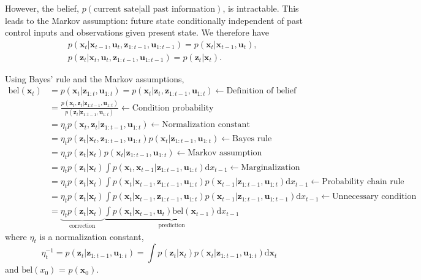 \documentclass[../Bayesian_Inference.tex]{subfiles}
\begin{document}
However, the belief, $p(\text{current sate} | \text{all past information})$, is intractable. This leads to the Markov assumption: future state conditionally independent of past control inputs and observations given present state. We therefore have
\[
    \begin{aligned}
        & p(\bm{x}_t | \bm{x}_{t-1}, \bm{u}_t, \bm{z}_{1:t-1}, \bm{u}_{1:t-1}) = p(\bm{x}_t | \bm{x}_{t-1}, \bm{u}_t), \\
        & p(\bm{z}_t | \bm{x}_{t}, \bm{u}_t, \bm{z}_{1:t-1}, \bm{u}_{1:t-1}) = p(\bm{z}_t | \bm{x}_{t}).
    \end{aligned}
\]

Using Bayes' rule and the Markov assumptions,
\[
    \begin{aligned}
        \mathrm{bel}(\bm{x}_t) & = p(\bm{x}_t | \bm{z}_{1:t}, \bm{u}_{1:t}) = p(\bm{x}_t | \bm{z}_t, \bm{z}_{1:t-1}, \bm{u}_{1:t}) \leftarrow \text{Definition of belief} \\
        & = \frac{p(\bm{x}_t, \bm{z}_t |\bm{z}_{1:t-1}, \bm{u}_{1:t})}{p(\bm{z}_t | \bm{z}_{1:t-1},\bm{u}_{1:t})} \leftarrow \text{Condition probability} \\
        & = \eta_t p(\bm{x}_t, \bm{z}_t | \bm{z}_{1:t-1}, \bm{u}_{1:t}) \leftarrow \text{Normalization constant}\\
        & = \eta_t p(\bm{z}_t | \bm{x}_t, \bm{z}_{1:t-1}, \bm{u}_{1:t}) p(\bm{x}_t | \bm{z}_{1:t-1}, \bm{u}_{1:t}) \leftarrow \text{Bayes rule}  \\
        & = \eta_t p(\bm{z}_t | \bm{x}_t) p(\bm{x}_t |\bm{z}_{1:t-1}, \bm{u}_{1:t}) \leftarrow \text{Markov assumption}  \\
        & = \eta_t p(\bm{z}_t | \bm{x}_t) \int p(\bm{x}_t, \bm{x}_{t-1} | \bm{z}_{1:t-1}, \bm{u}_{1:t}) \mathrm{d} x_{t-1} \leftarrow \text{Marginalization} \\
        & = \eta_t p(\bm{z}_t | \bm{x}_t) \int p(\bm{x}_t  | \bm{x}_{t-1}, \bm{z}_{1:t-1}, \bm{u}_{1:t}) p (\bm{x}_{t-1} | \bm{z}_{1:t-1}, \bm{u}_{1:t}) \mathrm{d} x_{t-1} \leftarrow \text{Probability chain rule} \\
        & = \eta_t p(\bm{z}_t | \bm{x}_t) \int p(\bm{x}_t  | \bm{x}_{t-1}, \bm{z}_{1:t-1}, \bm{u}_{1:t}) p (\bm{x}_{t-1} | \bm{z}_{1:t-1}, \bm{u}_{1:t-1}) \mathrm{d} x_{t-1} \leftarrow \text{Unnecessary condition} \\
        & = \underbrace{\eta_t p(\bm{z}_t | \bm{x}_t)}_{\text{correction}}  \underbrace{\int p(\bm{x}_t  | \bm{x}_{t-1}, \bm{u}_t) \mathrm{bel}(\bm{x}_{t-1}) \mathrm{d} x_{t-1}}_{\text{prediction}}
    \end{aligned} 
\]
where $\eta_t$ is a normalization constant,
\[
    \eta_t^{-1} = p(\bm{z}_t | \bm{z}_{1:t-1}, \bm{u}_{1:t}) = \int p(\bm{z}_t | \bm{x}_{t}) p(\bm{x}_{t} | \bm{z}_{1:t-1}, \bm{u}_{1:t}) \mathrm{d} \bm{x}_t
\]
and $\mathrm{bel}(x_0)$ = $p(\bm{x}_0)$.
\end{document}
